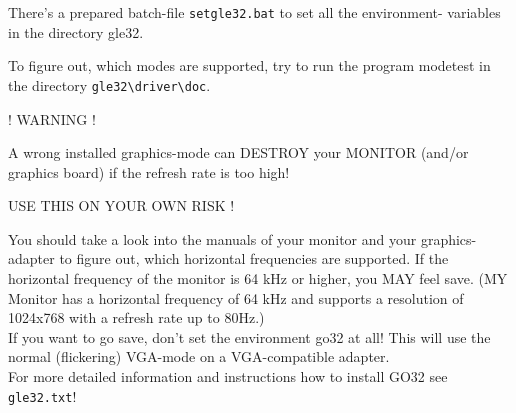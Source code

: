 There's a prepared batch-file \verb#setgle32.bat# to set all the environment-
variables in the directory gle32.

To figure out, which modes are supported, try to run the program
modetest in the directory \verb#gle32\driver\doc#.\\

\begin{center} ! WARNING !\end{center}

A wrong installed graphics-mode can DESTROY your MONITOR (and/or graphics 
board) if the refresh rate is too high!

\begin{center} USE THIS ON YOUR OWN RISK ! \end{center}

You should take a look into the manuals of your monitor and your 
graphics-adapter to figure out, which horizontal frequencies are supported. 
If the horizontal frequency of the monitor is 64 kHz or higher, 
you MAY feel save. (MY Monitor has a horizontal frequency of 64 kHz and 
supports a resolution of 1024x768 with a refresh rate up to 80Hz.)\\
% 
If you want to go save, don't set the environment go32 at all! 
This will use the normal (flickering) VGA-mode on a VGA-compatible 
adapter.\\
%
For more detailed information and instructions how to install GO32 see
\verb#gle32.txt#!
